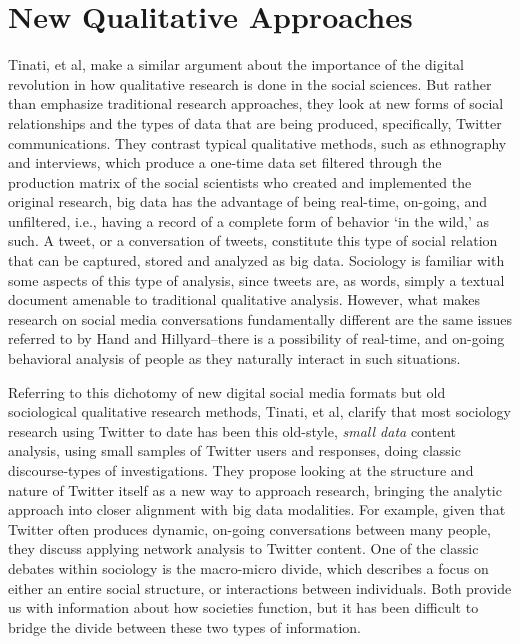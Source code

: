 \documentclass[sigconf]{acmart}
\begin{document}
\section{New Qualitative Approaches}
Tinati, et al, make a similar argument about the importance of the digital revolution in how qualitative research is done in the social sciences. \cite{tinati14}  But rather than emphasize traditional research approaches, they look at new forms of social relationships and the types of data that are being produced, specifically, Twitter communications.  They contrast typical qualitative methods, such as ethnography and interviews, which produce a one-time data set filtered through the production matrix of the social scientists who created and implemented the original research, big data has the advantage of being real-time, on-going, and unfiltered, i.e., having a record of a complete form of behavior `in the wild,' as such.  A tweet, or a conversation of tweets, constitute this type of social relation that can be captured, stored and analyzed as big data. \cite{felt16}  Sociology is familiar with some aspects of this type of analysis, since tweets are, as words, simply a textual document amenable to traditional qualitative analysis.  However, what makes research on social media conversations fundamentally different are the same issues referred to by Hand and Hillyard--there is a possibility of real-time, and on-going behavioral analysis of people as they naturally interact in such situations. \cite{hand14}

Referring to this dichotomy of new digital social media formats but old sociological qualitative research methods, Tinati, et al, clarify that most sociology research using Twitter to date has been this old-style, {\em small data} content analysis, using small samples of Twitter users and responses, doing classic discourse-types of investigations.  They propose looking at the structure and nature of Twitter itself as a new way to approach research, bringing the analytic approach into closer alignment with big data modalities.  For example, given that Twitter often produces dynamic, on-going conversations between many people, they discuss applying network analysis to Twitter content. \cite{felt16} One of the classic debates within sociology is the macro-micro divide, which describes a focus on either an entire social structure, or interactions between individuals.  Both provide us with information about how societies function, but it has been difficult to bridge the divide between these two types of information.  
\end{document}
